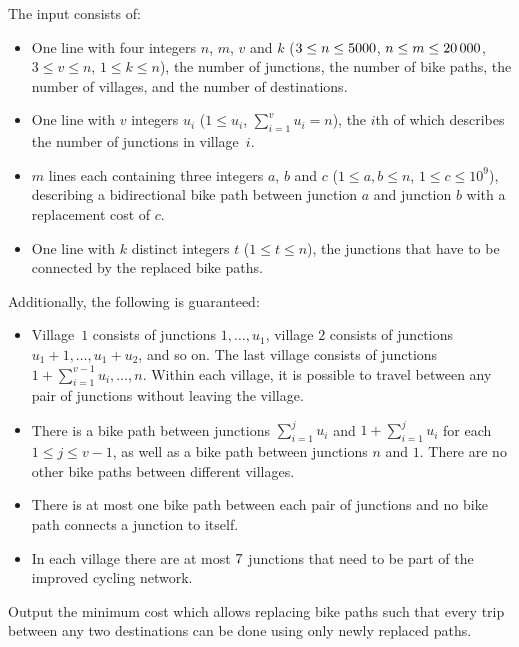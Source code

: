 \begin{Input}
    The input consists of:
    \begin{itemize}
    \item One line with four integers $n$, $m$, $v$ and $k$ ($3\leq n\leq 5000$, $n \leq m \leq 20\,000$, $3 \leq v \leq n$, $1 \leq k \leq n$), the number of junctions, the number of bike paths, the number of villages, and the number of destinations.
    \item One line with $v$ integers $u_i$ ($1 \leq u_i$, $\sum_{i=1}^v u_i = n$), the $i$th of which describes the number of junctions in village~$i$.
		\item $m$ lines each containing three integers $a$, $b$ and $c$ ($1 \leq a,b \leq n$, $1 \leq c \leq 10^9$), describing a bidirectional bike path between junction $a$ and junction $b$ with a replacement cost of $c$.
		\item One line with $k$ distinct integers $t$ ($1 \leq t \leq n$), the junctions that have to be connected by the replaced bike paths.
    \end{itemize}
\pagebreak
  Additionally, the following is guaranteed:
  \begin{itemize}
    \item Village~$1$ consists of junctions $1,\dots, u_1$, village $2$ consists of junctions $u_1 + 1, \dots, u_1 + u_2$, and so on.
      The last village consists of junctions $1+ \sum_{i = 1}^{v-1} u_i , \dots, n$.
      Within each village, it is possible to travel between any pair of junctions without leaving the village.
    \item There is a bike path between junctions $\sum_{i=1}^{j} u_i$ and $1 + \sum_{i=1}^{j} u_i$ for each $1 \leq j \leq v-1$, as well as a bike path between junctions $n$ and $1$.
      There are no other bike paths between different villages.
    \item There is at most one bike path between each pair of junctions and no bike path connects a junction to itself.
    \item In each village there are at most $7$ junctions that need to be part of the improved cycling network.
  \end{itemize}
\end{Input}

\begin{Output}
    Output the minimum cost which allows replacing bike paths such that every trip between any two destinations can be done using only newly replaced paths.
\end{Output}
